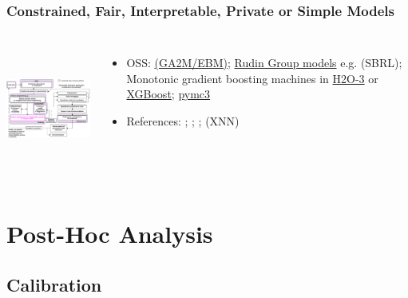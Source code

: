 \documentclass[11pt,
               aspectratio=169,
               hyperref={colorlinks}
               ]{beamer}
\begin{document}
			\begin{frame}
		
				\frametitle{Constrained, Fair, Interpretable, Private or Simple Models}		
			
				\begin{columns}
	
					\centering
					\includegraphics[height=120pt]{../img/im.png}
				
					\vspace{-5pt}
					\small
					\begin{itemize}
						\item OSS: \href{https://github.com/interpretml/interpret}{ (GA2M/EBM)}; \href{https://users.cs.duke.edu/~cynthia/code.html}{Rudin Group models} e.g.  (SBRL); Monotonic gradient boosting machines in \href{https://github.com/h2oai/h2o-3/blob/master/h2o-py/demos/H2O_tutorial_gbm_monotonicity.ipynb}{H2O-3} or \href{https://xiaoxiaowang87.github.io/monotonicity_constraint/}{XGBoost}; \href{https://docs.pymc.io/}{pymc3}
						\item References: ; ; ;  (XNN)
					\end{itemize}
					\normalsize
				
				\end{columns}			
			
			\end{frame}

	\section{Post-Hoc Analysis}

		\subsection{Calibration}
\end{document}
